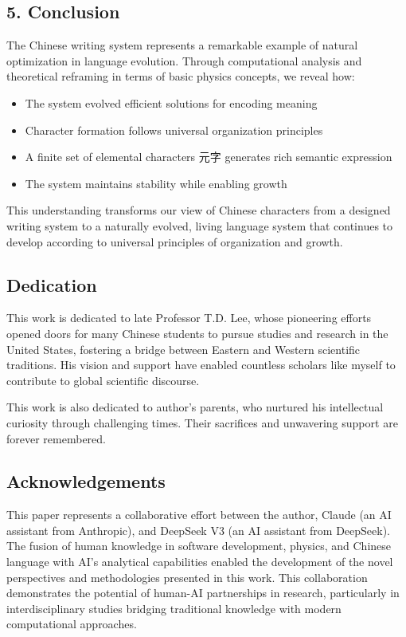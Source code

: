 \documentclass[
  11pt,
  letterpaper,
]{article}
\providecommand{\tightlist}{%
  \setlength{\itemsep}{0pt}\setlength{\parskip}{0pt}}
\begin{document}
\hypertarget{conclusion}{%
\subsection{5. Conclusion}\label{conclusion}}

The Chinese writing system represents a remarkable example of natural
optimization in language evolution. Through computational analysis and
theoretical reframing in terms of basic physics concepts, we reveal how:

\begin{itemize}
\tightlist
\item
  The system evolved efficient solutions for encoding meaning
\item
  Character formation follows universal organization principles
\item
  A finite set of elemental characters 元字 generates rich semantic
  expression
\item
  The system maintains stability while enabling growth
\end{itemize}

This understanding transforms our view of Chinese characters from a
designed writing system to a naturally evolved, living language system
that continues to develop according to universal principles of
organization and growth.

\hypertarget{dedication}{%
\subsection{Dedication}\label{dedication}}

This work is dedicated to late Professor T.D. Lee, whose pioneering
efforts opened doors for many Chinese students to pursue studies and
research in the United States, fostering a bridge between Eastern and
Western scientific traditions. His vision and support have enabled
countless scholars like myself to contribute to global scientific
discourse.

This work is also dedicated to author's parents, who nurtured his
intellectual curiosity through challenging times. Their sacrifices and
unwavering support are forever remembered.

\hypertarget{acknowledgements}{%
\subsection{Acknowledgements}\label{acknowledgements}}

This paper represents a collaborative effort between the author, Claude
(an AI assistant from Anthropic), and DeepSeek V3 (an AI assistant from
DeepSeek). The fusion of human knowledge in software development,
physics, and Chinese language with AI's analytical capabilities enabled
the development of the novel perspectives and methodologies presented in
this work. This collaboration demonstrates the potential of human-AI
partnerships in research, particularly in interdisciplinary studies
bridging traditional knowledge with modern computational approaches.
\end{document}
